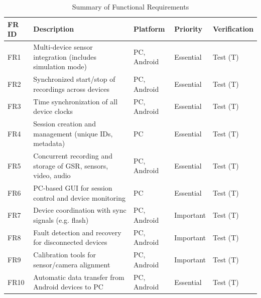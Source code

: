 \begin{table}[h!]
	\centering
	\caption{Summary of Functional Requirements}
	\label{tab:fr_summary}
	\begin{tabular}{@{}lllll@{}}
		\toprule
		\textbf{FR ID} & \textbf{Description}                                           & \textbf{Platform} & \textbf{Priority} & \textbf{Verification} \\ \midrule
		FR1            & Multi-device sensor integration (includes simulation mode)     & PC, Android       & Essential         & Test (T)              \\
		FR2            & Synchronized start/stop of recordings across devices           & PC, Android       & Essential         & Test (T)              \\
		FR3            & Time synchronization of all device clocks                      & PC, Android       & Essential         & Test (T)              \\
		FR4            & Session creation and management (unique IDs, metadata)         & PC                & Essential         & Test (T)              \\
		FR5            & Concurrent recording and storage of GSR, sensors, video, audio & PC, Android       & Essential         & Test (T)              \\
		FR6            & PC-based GUI for session control and device monitoring         & PC                & Essential         & Test (T)              \\
		FR7            & Device coordination with sync signals (e.g. flash)             & PC, Android       & Important         & Test (T)              \\
		FR8            & Fault detection and recovery for disconnected devices          & PC, Android       & Important         & Test (T)              \\
		FR9            & Calibration tools for sensor/camera alignment                  & PC, Android       & Important         & Test (T)              \\
		FR10           & Automatic data transfer from Android devices to PC             & PC, Android       & Essential         & Test (T)              \\ \bottomrule
	\end{tabular}
\end{table}
